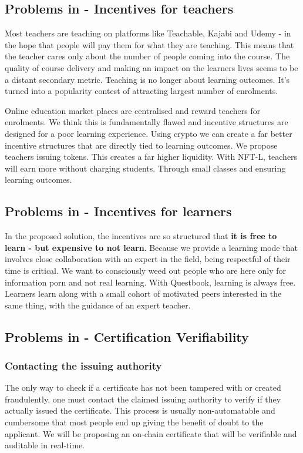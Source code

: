 \documentclass{article}
\begin{document}
    \subsection{Problems in - Incentives for teachers}
      Most teachers are teaching on platforms like Teachable, Kajabi and Udemy - in the hope that people will pay them for what they are teaching. 
      This means that the teacher cares only about the number of people coming into the course. The quality of course delivery and making an impact on the learners lives seems to be a distant secondary metric. Teaching is no longer about learning outcomes. It's turned into a popularity contest of attracting largest number of enrolments. 
      \par
       Online education market places are centralised and reward teachers for enrolments. We think this is fundamentally flawed and incentive structures are designed for a poor learning experience. Using crypto we can create a far better incentive structures that are directly tied to learning outcomes. We propose teachers issuing tokens. This creates a far higher liquidity.
       With NFT-L, teachers will earn more without charging students. Through small classes and ensuring learning outcomes.
     
       
       \subsection{Problems in - Incentives for learners}
      In the proposed solution, the incentives are so structured that \textbf{it is free to learn - but expensive to not learn}. Because we provide a learning mode that involves close collaboration with an expert in the field, being respectful of their time is critical. 
      We want to consciously weed out people who are here only for information porn and not real learning.
      With Questbook, learning is always free. Learners learn along with a small cohort of motivated peers interested in the same thing, with the guidance of an expert teacher.
      \subsection{Problems in - Certification Verifiability}
      \subsubsection{Contacting the issuing authority}
        The only way to check if a certificate has not been tampered with or created fraudulently, one must contact the claimed issuing authority to verify if they actually issued the certificate. 
        This process is usually non-automatable and cumbersome that most people end up giving the benefit of doubt to the applicant. 
        \break
        We will be proposing an on-chain certificate that will be verifiable and auditable in real-time.
\end{document}

